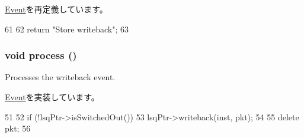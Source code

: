\hyperlink{classEvent_a130ddddf003422b413e2e891b1b80e8f}{Event}を再定義しています。


\begin{DoxyCode}
61 {
62     return "Store writeback";
63 }
\end{DoxyCode}
\hypertarget{classOzoneLWLSQ_1_1WritebackEvent_a2e9c5136d19b1a95fc427e0852deab5c}{
\subsubsection[{process}]{\setlength{\rightskip}{0pt plus 5cm}void process ()}}
\label{classOzoneLWLSQ_1_1WritebackEvent_a2e9c5136d19b1a95fc427e0852deab5c}
Processes the writeback event. 

\hyperlink{classEvent_a142b75b68a6291400e20fb0dd905b1c8}{Event}を実装しています。


\begin{DoxyCode}
51 {
52     if (!lsqPtr->isSwitchedOut()) {
53         lsqPtr->writeback(inst, pkt);
54     }
55     delete pkt;
56 }
\end{DoxyCode}


